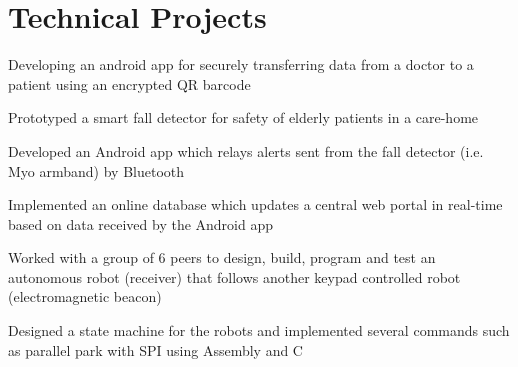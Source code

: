 \documentclass[]{aftab-resume}
\begin{document}
\begin{minipage}[t]{0.66\textwidth}
\section{Technical Projects}
\vspace{0.15cm}



\begin{tightemize}
\item Developing an android app for securely transferring data from a doctor to a patient using an encrypted QR barcode
\end{tightemize}

\sectionsep



\begin{tightemize}
\item Prototyped a smart fall detector for safety of elderly patients in a care-home 
\item Developed an Android app which relays alerts sent from the fall detector (i.e. Myo armband) by Bluetooth
\item Implemented an online database which updates a central web portal in real-time based on data received by the Android app
\end{tightemize}

\sectionsep



\begin{tightemize}
\item Worked with a group of 6 peers to design, build, program and test an autonomous robot (receiver) that follows another keypad controlled robot (electromagnetic beacon) 
\item Designed a state machine for the robots and implemented several commands such as parallel park with SPI using Assembly and C 
\end{tightemize}

\sectionsep

\end{minipage} %
\end{document}

